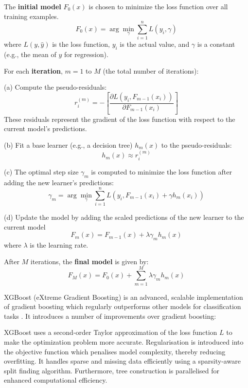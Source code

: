 The \textbf{initial model} \( F_0(x) \) is chosen to minimize the loss function over all training examples.
\begin{equation}
	F_0(x) = \arg\min_{\gamma} \sum_{i=1}^{n} L(y_i, \gamma)
\end{equation}
where \( L(y, \hat{y}) \) is the loss function, \( y_i \) is the actual value, and \( \gamma \) is a constant (e.g., the mean of \( y \) for regression).

For each \textbf{iteration}, \( m = 1 \) to \( M \) (the total number of iterations):

(a) Compute the pseudo-residuals:
\begin{equation}
	r_i^{(m)} = -\left[\frac{\partial L(y_i, F_{m-1}(x_i))}{\partial F_{m-1}(x_i)}\right]
\end{equation}
These residuals represent the gradient of the loss function with respect to the current model's predictions.

(b) Fit a base learner (e.g., a decision tree) \( h_m(x) \) to the pseudo-residuals:
\begin{equation}
	h_m(x) \approx r_i^{(m)}
\end{equation}

(c) The optimal step size \( \gamma_m \) is computed to minimize the loss function after adding the new learner's predictions:
\begin{equation}
	\gamma_m = \arg\min_{\gamma} \sum_{i=1}^{n} L(y_i, F_{m-1}(x_i) + \gamma h_m(x_i))
\end{equation}

(d) Update the model by adding the scaled predictions of the new learner to the current model
\begin{equation}
	F_m(x) = F_{m-1}(x) + \lambda \gamma_m h_m(x)
\end{equation}
where \( \lambda \) is the learning rate.

After \( M \) iterations, the \textbf{final model} is given by:
\begin{equation}
	F_M(x) = F_0(x) + \sum_{m=1}^{M} \lambda \gamma_m h_m(x)
\end{equation}

XGBoost (eXtreme Gradient Boosting) \cite{xgboost} is an advanced, scalable implementation of gradient boosting which regularly outperforms other models for classification tasks \cite{gradboostingwins}. It introduces a number of improvements over gradient boosting:

XGBoost uses a second-order Taylor approximation of the loss function $L$ to make the optimization problem more accurate. Regularisation is introduced into the objective function which penalises model complexity, thereby reducing overfitting. It handles sparse and missing data efficiently using a sparsity-aware split finding algorithm. Furthermore, tree construction is parallelised for enhanced computational efficiency.

